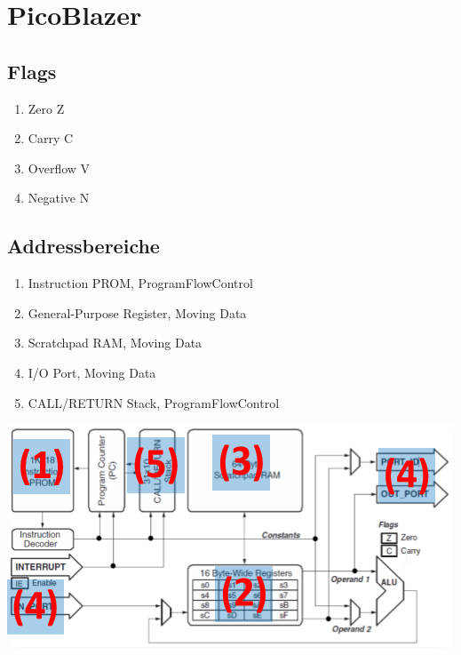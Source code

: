 \section{PicoBlazer}
\subsection{Flags}
\begin{enumerate}[nosep]
	\item Zero Z
	\item Carry C
	\item Overflow V
	\item Negative N
\end{enumerate}


\subsection{Addressbereiche}
\begin{enumerate}[nosep]
	\item Instruction PROM, ProgramFlowControl
	\item General-Purpose Register, Moving Data
	\item Scratchpad RAM, Moving Data
	\item I/O Port, Moving Data
	\item CALL/RETURN Stack, ProgramFlowControl
\end{enumerate}

\includegraphics[width=\columnwidth]{Images/addressranges}


